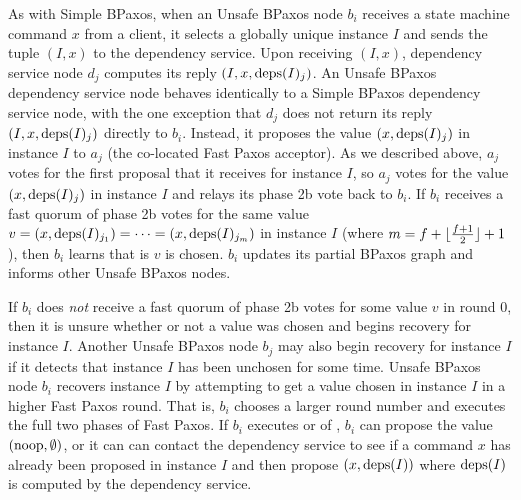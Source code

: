 As with Simple BPaxos, when an Unsafe BPaxos node $b_i$ receives a state
machine command $x$ from a client, it selects a globally unique instance $I$
and sends the tuple $(I, x)$ to the dependency service. Upon receiving $(I,
x)$, dependency service node $d_j$ computes its reply $(I, x, \text{deps}(I)_j)$.  An
Unsafe BPaxos dependency service node behaves identically to a Simple BPaxos
dependency service node, with the one exception that $d_j$ does not return its
reply $(I, x, \text{deps}(I)_j)$ directly to $b_i$. Instead, it proposes the value
$(x, \text{deps}(I)_j)$ in instance $I$ to $a_j$ (the co-located Fast Paxos
acceptor). As we described above, $a_j$ votes for the first proposal that it
receives for instance $I$, so $a_j$ votes for the value $(x, \text{deps}(I)_j)$ in
instance $I$ and relays its phase 2b vote back to $b_i$.
%
If $b_i$ receives a fast quorum of phase 2b votes for the same value $v = (x,
\text{deps}(I)_{j_1}) = \cdots = (x, \text{deps}(I)_{j_m})$ in instance $I$ (where $m =
f + \lfloor\frac{f + 1}{2}\rfloor + 1$), then $b_i$ learns that is $v$ is chosen. $b_i$ updates its
partial BPaxos graph and informs other Unsafe BPaxos nodes.

If $b_i$ does \emph{not} receive a fast quorum of phase 2b votes for some value
$v$ in round 0, then it is unsure whether or not a value was chosen and begins
recovery for instance $I$. Another Unsafe BPaxos node $b_j$ may also begin
recovery for instance $I$ if it detects that instance $I$ has been unchosen for
some time.
%
Unsafe BPaxos node $b_i$ recovers instance $I$ by attempting to get a value
chosen in instance $I$ in a higher Fast Paxos round. That is, $b_i$ chooses a
larger round number and executes the full two phases of Fast Paxos. If $b_i$
executes  or  of
, $b_i$ can propose the value $(\text{noop}, \emptyset)$, or it
can can contact the dependency service to see if a command $x$ has already been
proposed in instance $I$ and then propose $(x, \text{deps}(I))$ where $\text{deps}(I)$ is
computed by the dependency service.

